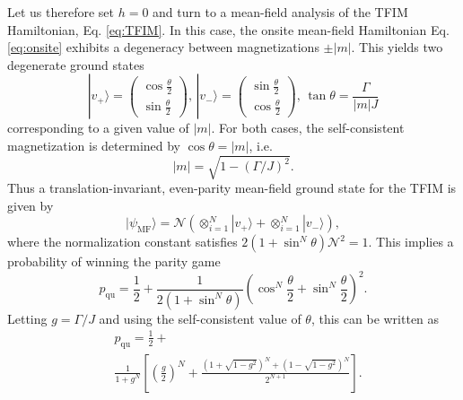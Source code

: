 \documentclass[prb,twocolumn,showpacs,amssymb,superscriptaddress]{revtex4-2}
\begin{document}
Let us therefore set $h=0$ and turn to a mean-field analysis of the TFIM Hamiltonian, Eq. \eqref{eq:TFIM}. In this case, the onsite mean-field Hamiltonian Eq. \eqref{eq:onsite} exhibits a degeneracy between magnetizations $\pm |m|$. This yields two degenerate ground states
\begin{equation}
|v_+\rangle = \begin{pmatrix} \cos{\frac{\theta}{2}} \\ \sin{\frac{\theta}{2}}\end{pmatrix}, \, |v_-\rangle= 
\begin{pmatrix} \sin{\frac{\theta}{2}} \\ \cos{\frac{\theta}{2}}\end{pmatrix},\, \tan{\theta} = \frac{\Gamma}{|m|J}
\end{equation}
corresponding to a given value of $|m|$. For both cases, the self-consistent magnetization is determined by $\cos{\theta} = |m|$, i.e.
\begin{equation}
\label{eq:selfconsmag}
|m| = \sqrt{1-(\Gamma/J)^2}.
\end{equation}
Thus a translation-invariant, even-parity mean-field ground state for the TFIM is given by
\begin{equation}
|\psi_{\mathrm{MF}}\rangle = \mathcal{N} (\otimes_{i=1}^N |v_+\rangle+\otimes_{i=1}^N |v_-\rangle),
\end{equation}
where the normalization constant satisfies $2(1+\sin^N{\theta})\mathcal{N}^2=1$. This implies a probability of winning the parity game
\begin{equation}
\label{eq:TFIMMF}
p_{\mathrm{qu}} = \frac{1}{2} + \frac{1}{2(1+\sin^{N}{\theta})} \left(\cos^{N}{\frac{\theta}{2}} +\sin^{N}{\frac{\theta}{2}}\right)^2.
\end{equation}
Letting $g = \Gamma/J$ and using the self-consistent value of $\theta$, this can be written as
\begin{align}
\nonumber
&p_{\mathrm{qu}} = 
\frac{1}{2}+ \\
&\frac{1}{1 + g^N} \left[\left(\frac{g}{2}\right)^N + \frac{(1 + \sqrt{1-g^2})^N + (1 - \sqrt{1-g^2})^N}{2^{N+1}}\right].
\end{align}
\end{document}
